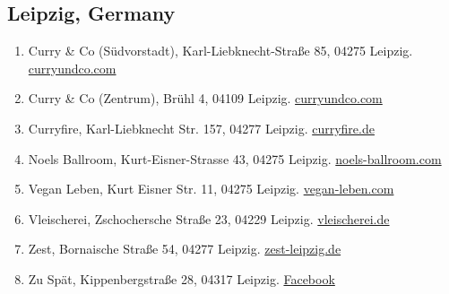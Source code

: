 \subsection{Leipzig, Germany}
\begin{enumerate}
	\item Curry \& Co (Südvorstadt), Karl-Liebknecht-Straße 85, 04275 Leipzig. \href{http://curryundco.com/}{curryundco.com}
	\item Curry \& Co (Zentrum), Brühl 4, 04109 Leipzig. \href{http://curryundco.com/}{curryundco.com}
	\item Curryfire, Karl-Liebknecht Str. 157, 04277 Leipzig. \href{http://www.curryfire.de/}{curryfire.de}
	\item Noels Ballroom, Kurt-Eisner-Strasse 43, 04275 Leipzig. \href{http://noels-ballroom.com/}{noels-ballroom.com}
	\item Vegan Leben, Kurt Eisner Str. 11, 04275 Leipzig. \href{http://vegan-leben.com/}{vegan-leben.com}
	\item Vleischerei, Zschochersche Straße 23, 04229 Leipzig. \href{http://vleischerei.de/}{vleischerei.de}
	\item Zest, Bornaische Straße 54, 04277 Leipzig. \href{http://zest-leipzig.de/}{zest-leipzig.de}
	\item Zu Spät, Kippenbergstraße 28, 04317 Leipzig. \href{https://facebook.com/pages/Zu-Sp%C3%A4t/310145699093440}{Facebook}
\end{enumerate}
